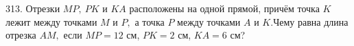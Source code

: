 313. Отрезки $MP,\ PK$ и $KA$ расположены на одной прямой, причём точка $K$ лежит между точками $M$ и $P,$ а точка $P$ между точками $A$ и $K.$Чему равна длина отрезка $AM,$ если $MP=12$ см, $PK=2$ см, $KA=6$ см?\\
